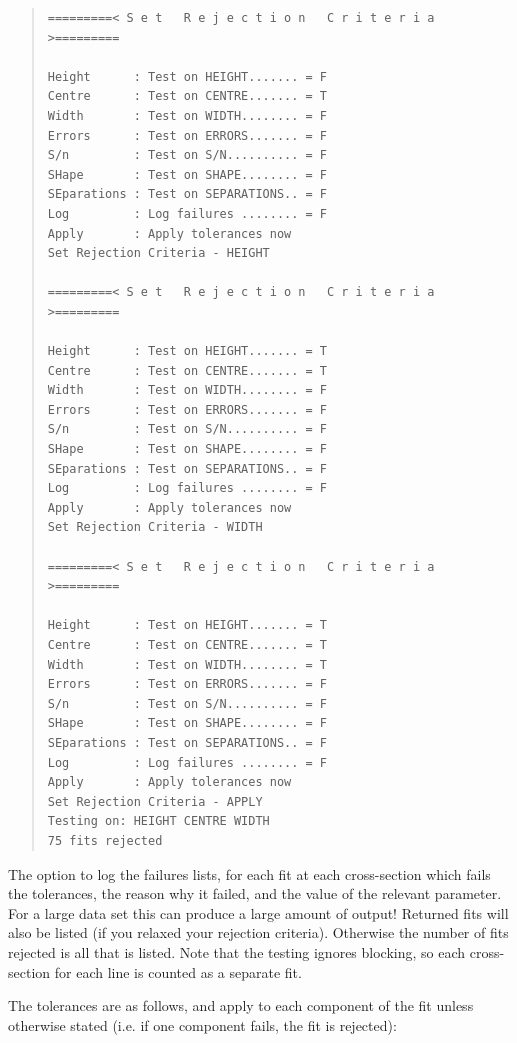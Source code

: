 \documentclass[11pt,twoside]{article}
\begin{document}
\begin{quote}
\begin{verbatim}
=========< S e t   R e j e c t i o n   C r i t e r i a >=========

Height      : Test on HEIGHT....... = F
Centre      : Test on CENTRE....... = T
Width       : Test on WIDTH........ = F
Errors      : Test on ERRORS....... = F
S/n         : Test on S/N.......... = F
SHape       : Test on SHAPE........ = F
SEparations : Test on SEPARATIONS.. = F
Log         : Log failures ........ = F
Apply       : Apply tolerances now
Set Rejection Criteria - HEIGHT

=========< S e t   R e j e c t i o n   C r i t e r i a >=========

Height      : Test on HEIGHT....... = T
Centre      : Test on CENTRE....... = T
Width       : Test on WIDTH........ = F
Errors      : Test on ERRORS....... = F
S/n         : Test on S/N.......... = F
SHape       : Test on SHAPE........ = F
SEparations : Test on SEPARATIONS.. = F
Log         : Log failures ........ = F
Apply       : Apply tolerances now
Set Rejection Criteria - WIDTH

=========< S e t   R e j e c t i o n   C r i t e r i a >=========

Height      : Test on HEIGHT....... = T
Centre      : Test on CENTRE....... = T
Width       : Test on WIDTH........ = T
Errors      : Test on ERRORS....... = F
S/n         : Test on S/N.......... = F
SHape       : Test on SHAPE........ = F
SEparations : Test on SEPARATIONS.. = F
Log         : Log failures ........ = F
Apply       : Apply tolerances now
Set Rejection Criteria - APPLY
Testing on: HEIGHT CENTRE WIDTH
75 fits rejected
\end{verbatim}\end{quote}

The option to log the failures lists, for each fit at each
cross-section which fails the tolerances, the reason why it failed, and
the value of the relevant parameter.
For a large data set this can produce a large amount of output!
Returned fits will also be listed (if you relaxed your rejection
criteria).
Otherwise the number of fits rejected is all that is listed.
Note that the testing ignores blocking, so each cross-section for each
line is counted as a separate fit.

The tolerances are as follows, and apply to each component of the fit
unless otherwise stated (i.e. if one component fails, the fit is
rejected):
\end{document}
